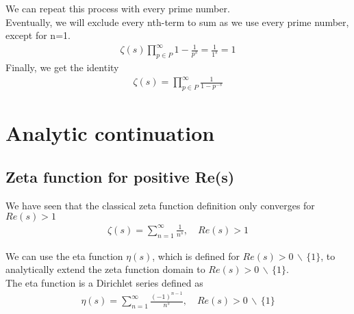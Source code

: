 \documentclass{article}
\newcommand{\exceptone}{
    \,\backslash\,\{1\}
}
\begin{document}
We can repeat this process with every prime number.
\\
Eventually, we will exclude every nth-term to sum as we use every prime number, except for n=1.
\begin{align*}
    \zeta(s)\prod_{p\in P}^{\infty}1-\frac{1}{p^s}=\frac{1}{1^s}=1
\end{align*}
Finally, we get the identity
\begin{align*}
    \zeta(s)=
    \prod_{p\in P}^{\infty}\frac{1}{1-p^{-s}}
\end{align*}

\pagebreak

\section{Analytic continuation}

\subsection{Zeta function for positive Re(s)}

We have seen that the classical zeta function definition only converges for $Re(s)>1$
\begin{align*}
    \zeta(s)=\sum_{n=1}^{\infty}\frac{1}{n^s},
    \quad Re(s)>1
\end{align*}

We can use the eta function $\eta(s)$, which is defined for $Re(s)>0\exceptone$, to analytically extend the zeta function domain to $Re(s)>0\exceptone$.
\\
The eta function is a Dirichlet series defined as
\begin{align*}
    \eta(s)=\sum_{n=1}^{\infty}\frac{(-1)^{n-1}}{n^s},
    \quad Re(s)>0\exceptone
\end{align*}
\end{document}
